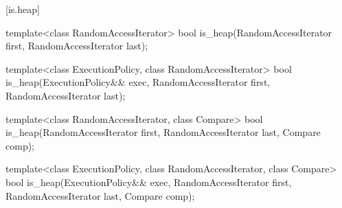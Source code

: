 [is.heap]{}

%
\begin{itemdecl}
template<class RandomAccessIterator>
  bool is_heap(RandomAccessIterator first, RandomAccessIterator last);
\end{itemdecl}

\begin{itemdescr}
\pnum
\returns {}
\end{itemdescr}


%
\begin{itemdecl}
template<class ExecutionPolicy, class RandomAccessIterator>
  bool is_heap(ExecutionPolicy&& exec,
               RandomAccessIterator first, RandomAccessIterator last);
\end{itemdecl}

\begin{itemdescr}
\pnum
\returns {}
\end{itemdescr}


%
\begin{itemdecl}
template<class RandomAccessIterator, class Compare>
  bool is_heap(RandomAccessIterator first, RandomAccessIterator last, Compare comp);
\end{itemdecl}

\begin{itemdescr}
\pnum
\returns {}
\end{itemdescr}


%
\begin{itemdecl}
template<class ExecutionPolicy, class RandomAccessIterator, class Compare>
  bool is_heap(ExecutionPolicy&& exec,
               RandomAccessIterator first, RandomAccessIterator last, Compare comp);
\end{itemdecl}

\begin{itemdescr}
\pnum
\returns {}
\end{itemdescr}


